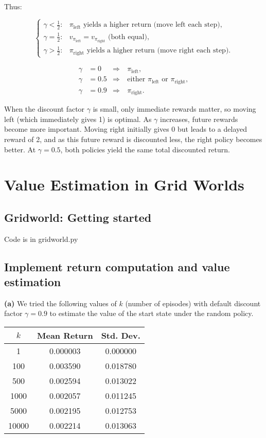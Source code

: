 \documentclass[11pt]{article}
\begin{document}
Thus:

\[
\begin{cases}
\gamma < \tfrac{1}{2}: & \pi_{\text{left}} \text{ yields a higher return (move left each step)},\\[4pt]
\gamma = \tfrac{1}{2}: & v_{\pi_{\text{left}}}=v_{\pi_{\text{right}}} \text{ (both equal)},\\[4pt]
\gamma > \tfrac{1}{2}: & \pi_{\text{right}} \text{ yields a higher return (move right each step)}.
\end{cases}
\]

\vspace{0.1cm}

\[
\boxed{
\begin{aligned}
\gamma &= 0   &\Rightarrow&\ \pi_{\text{left}},\\[4pt]
\gamma &= 0.5 &\Rightarrow&\ \text{either } \pi_{\text{left}} \text{ or } \pi_{\text{right}},\\[4pt]
\gamma &= 0.9 &\Rightarrow&\ \pi_{\text{right}}.
\end{aligned}
}
\]


\noindent When the discount factor $\gamma$ is small, only immediate rewards matter, so moving left (which immediately gives 1) is optimal. As $\gamma$ increases, future rewards become more important. Moving right initially gives 0 but leads to a delayed reward of 2, and as this future reward is discounted less, the right policy becomes better. At $\gamma = 0.5$, both policies yield the same total discounted return.

\section{Value Estimation in Grid Worlds}

\subsection{Gridworld: Getting started}
Code is in gridworld.py

\subsection{Implement return computation and value estimation}

\textbf{(a)} We tried the following values of \(k\) (number of episodes) with default discount factor \(\gamma = 0.9\) to estimate the value of the start state under the random policy. 

\begin{center}
\begin{tabular}{c|c|c}
\textbf{\(k\)} & \textbf{Mean Return} & \textbf{Std. Dev.} \\
\hline
1     & 0.000003 & 0.000000 \\
100   & 0.003590 & 0.018780 \\
500   & 0.002594 & 0.013022 \\
1000  & 0.002057 & 0.011245 \\
5000  & 0.002195 & 0.012753 \\
10000 & 0.002214 & 0.013063 \\
\end{tabular}
\end{center}
\end{document}
